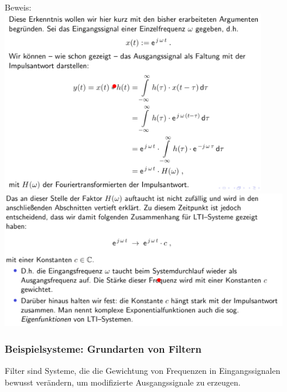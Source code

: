 \documentclass[12pt,a4paper]{scrartcl}
\begin{document}
    \noindent Beweis: \\
    \includegraphics[height=8cm]{Pictures/Beweis.png} \\
    \includegraphics[height=6cm]{Pictures/Beweis2.png}

    \subsubsection{Beispielsysteme: Grundarten von Filtern}
    \label{sec:sub:sub:grundarten-filter}
    Filter sind Systeme, die die Gewichtung von Frequenzen in Eingangssignalen bewusst verändern, um modifizierte Ausgangssignale zu erzeugen. \\
\end{document}
